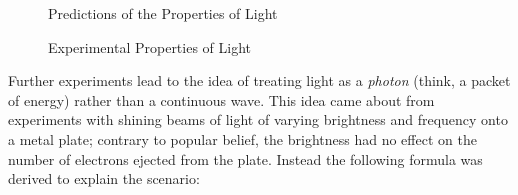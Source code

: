 \documentclass[12pt]{article}
\begin{document}
    \begin{figure}[!ht]%
        \centering
        \qquad
        \caption{Predictions of the Properties of Light}
        \label{fig:experimentallight}%
    \end{figure}
    
    \begin{figure}[!ht]%
        \centering
        \qquad
        \caption{Experimental Properties of Light}
        \label{fig:experimentallight}%
    \end{figure}

    Further experiments lead to the idea of treating light as a \textit{photon} (think, a packet of energy) rather than a continuous wave. This idea came about from experiments with shining beams of light of varying brightness and frequency onto a metal plate; contrary to popular belief, the brightness had no effect on the number of electrons ejected from the plate. Instead the following formula was derived to explain the scenario:
\end{document}
